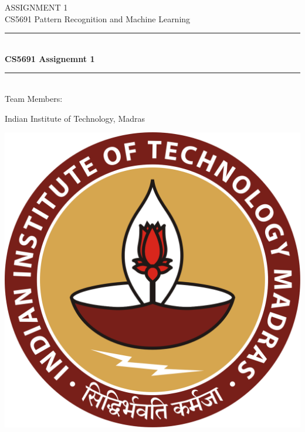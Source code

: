 \documentclass[12pt,a4paper]{article}
\begin{document}
    \begin{titlepage} 
        \begin{center}
        \large{ASSIGNMENT 1}\\
        \vspace{2em}
        \large {CS5691 Pattern Recognition and Machine Learning}
        \vspace{3em}
        
        \rule{0.9\linewidth}{0.5mm} \\[0.4cm]
        {\Large{\bfseries{CS5691 Assignemnt 1}}} \\
        \rule{0.9\linewidth}{0.5mm} \\[3 em]    
        
        Team Members: \\
        \vspace{0.5em}
        

        \vspace{1em}

        Indian Institute of Technology, Madras\\    
        
        \vspace{5em}    
        
            \includegraphics[scale=0.09]{images/iitmlogo.png}
        \end{center}
    \end{titlepage}
{\hypersetup{linkcolor=black}
\tableofcontents}
\break
\end{document}
